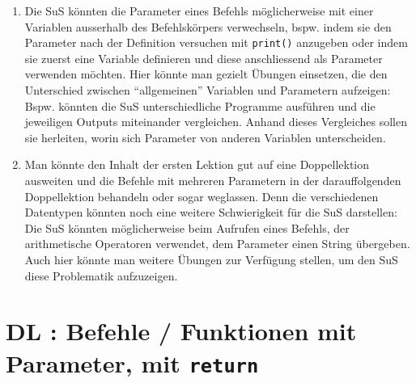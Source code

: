 \begin{myExBox}[title=DL \themycounter]
\begin{myExBox}[title=Mögliche Schwierigkeiten \& geeignete Massnahmen]
\begin{enumerate}
    \item Die SuS könnten die Parameter eines Befehls möglicherweise mit einer Variablen ausserhalb des Befehlskörpers verwechseln, bspw. indem sie den Parameter nach der Definition versuchen mit \lstinline|print()| anzugeben oder indem sie zuerst eine Variable definieren und diese anschliessend als Parameter verwenden möchten. Hier könnte man gezielt Übungen einsetzen, die den Unterschied zwischen ``allgemeinen'' Variablen und Parametern aufzeigen: Bspw. könnten die SuS unterschiedliche Programme ausführen und die jeweiligen Outputs miteinander vergleichen. Anhand dieses Vergleiches sollen sie herleiten, worin sich Parameter von anderen Variablen unterscheiden.
    \item Man könnte den Inhalt der ersten Lektion gut auf eine Doppellektion ausweiten und die Befehle mit mehreren Parametern in der darauffolgenden Doppellektion behandeln oder sogar weglassen. Denn die verschiedenen Datentypen könnten noch eine weitere Schwierigkeit für die SuS darstellen: Die SuS könnten möglicherweise beim Aufrufen eines Befehls, der arithmetische Operatoren verwendet, dem Parameter einen String übergeben. Auch hier könnte man weitere Übungen zur Verfügung stellen, um den SuS diese Problematik aufzuzeigen.
\end{enumerate}
\end{myExBox}
\end{myExBox}
\newpage{}

\section{DL \themycounter: Befehle / Funktionen mit Parameter, mit \texorpdfstring{\lstinline|return|}{return}}

